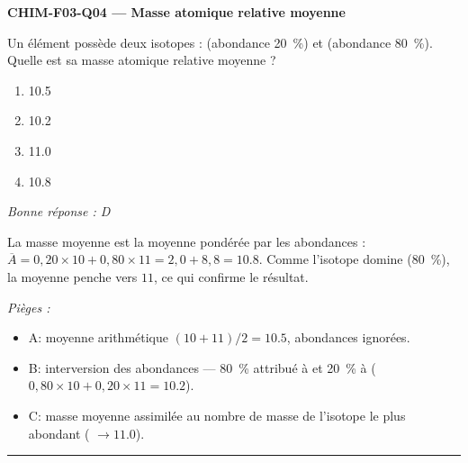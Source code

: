 \documentclass[11pt,a4paper]{article}
\begin{document}
\noindent\textbf{CHIM-F03-Q04 --- Masse atomique relative moyenne}\par
Un élément possède deux isotopes :  (abondance \qty{20}{\percent}) et  (abondance \qty{80}{\percent}). Quelle est sa masse atomique relative moyenne ?
\begin{enumerate}[label=\Alph*)]
\item \num{10.5}
\item \num{10.2}
\item \num{11.0}
\item \num{10.8}
\end{enumerate}
\textit{Bonne réponse : D}\par
La masse moyenne est la moyenne pondérée par les abondances : $\overline{A} = 0{,}20\times 10 + 0{,}80\times 11 = 2{,}0 + 8{,}8 = \num{10.8}$. Comme l'isotope  domine (\qty{80}{\percent}), la moyenne penche vers $11$, ce qui confirme le résultat.\par
\textit{Pièges :}
\begin{itemize}
\item A: moyenne arithmétique $(10+11)/2 = \num{10.5}$, abondances ignorées.
\item B: interversion des abondances --- \qty{80}{\percent} attribué à  et \qty{20}{\percent} à  ($0{,}80\times 10 + 0{,}20\times 11 = \num{10.2}$).
\item C: masse moyenne assimilée au nombre de masse de l'isotope le plus abondant ( $\to \num{11.0}$).
\end{itemize}
\vspace{8pt}\hrule\vspace{8pt}
\end{document}
